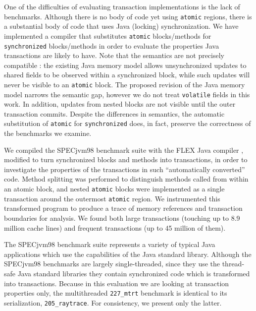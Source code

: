 \documentclass{csa-sig-alternate}
\begin{document}
One of the difficulties of evaluating transaction implementations is the
lack of benchmarks.  Although there is no body of
code yet using {\tt atomic} regions, there is a substantial body of
code that uses Java (locking) synchronization.  We have implemented a
compiler that substitutes {\tt atomic} blocks/methods for {\tt
  synchronized} blocks/methods in order to evaluate the properties
Java transactions are likely to have.  Note that the semantics are not
precisely compatible \cite{BlundellLeMa05}: the existing Java memory
model allows 
unsynchronized updates to shared fields to be observed within a
synchronized block, while such updates will never be visible to an
{\tt atomic} block.  The proposed revision of the Java memory model
\cite{MansonPu02} narrows the semantic gap, however we do not treat
{\tt volatile} fields in this work.  In addition, updates from nested
blocks are not visible until the outer transaction commits.
Despite the differences in semantics, the automatic substitution of
{\tt atomic} for {\tt synchronized} does, in fact, preserve the
correctness of the benchmarks we examine.

We compiled the SPECjvm98 benchmark suite with the FLEX Java compiler
\cite{Flex},
modified to turn synchronized blocks and methods into transactions,
in order to investigate the properties of the transactions in such
``automatically converted'' code.
Method splitting was performed to distinguish methods called from
within an atomic block, and nested
\texttt{atomic} blocks were implemented as a single
transaction around the outermost \texttt{atomic} region.  We
instrumented this transformed program to produce a trace of
memory references and transaction boundaries for analysis.
We found both large
transactions (touching up to 8.9 million cache lines) and frequent
transactions (up to 45 million of them).

The SPECjvm98 benchmark suite represents a variety of typical Java
applications which use the capabilities of the Java standard library.
Although the SPECjvm98 benchmarks are largely single-threaded, since
they use the thread-safe Java standard libraries they contain
synchronized code which is transformed into transactions.  Because in
this evaluation we are looking at transaction properties only, the
multithreaded \texttt{227\_mtrt} benchmark is identical to its
serialization, \texttt{205\_raytrace}.  For consistency, we present
only the latter.
\end{document}
